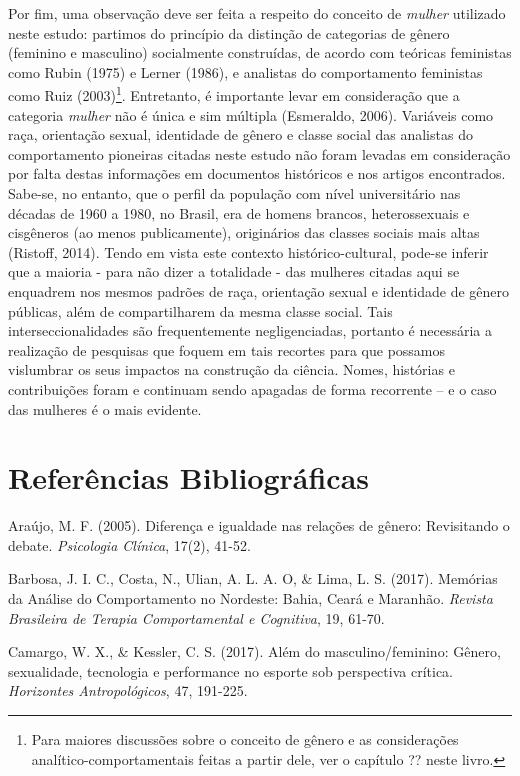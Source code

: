 Por fim, uma observação deve ser feita a respeito do conceito de \textit{mulher} utilizado neste estudo: partimos do princípio da distinção de categorias de gênero (feminino e masculino) socialmente construídas, de acordo com teóricas feministas como Rubin (1975) e Lerner (1986), e analistas do comportamento feministas como Ruiz (2003)\footnote{Para maiores discussões sobre o conceito de gênero e as considerações analítico-comportamentais feitas a partir dele, ver o capítulo ?? neste livro.}. Entretanto, é importante levar em consideração que a categoria \textit{mulher} não é única e sim múltipla (Esmeraldo, 2006). Variáveis como raça, orientação sexual, identidade de gênero e classe social das analistas do comportamento pioneiras citadas neste estudo não foram levadas em consideração por falta destas informações em documentos históricos e nos artigos encontrados. Sabe-se, no entanto, que o perfil da população com nível universitário nas décadas de 1960 a 1980, no Brasil, era de homens brancos, heterossexuais e cisgêneros (ao menos publicamente), originários das classes sociais mais altas (Ristoff, 2014). Tendo em vista este contexto histórico-cultural, pode-se inferir que a maioria - para não dizer a totalidade - das mulheres citadas aqui se enquadrem nos mesmos padrões de raça, orientação sexual e identidade de gênero públicas, além de compartilharem da mesma classe social. Tais interseccionalidades são frequentemente negligenciadas, portanto é necessária a realização de pesquisas que foquem em tais recortes para que possamos vislumbrar os seus impactos na construção da ciência. Nomes, histórias e contribuições foram e continuam sendo apagadas de forma recorrente – e o caso das mulheres é o mais evidente.

\chapter*{Referências Bibliográficas}
\hangindent=25pt
\noindent Araújo, M. F. (2005). Diferença e igualdade nas relações de gênero: Revisitando o debate. \textit{Psicologia Clínica}, 17(2), 41-52.

\hangindent=25pt
\noindent Barbosa, J. I. C., Costa, N., Ulian, A. L. A. O, \& Lima, L. S. (2017). Memórias da Análise do Comportamento no Nordeste: Bahia, Ceará e Maranhão. \textit{Revista Brasileira de Terapia Comportamental e Cognitiva}, 19, 61-70.

\hangindent=25pt
\noindent Camargo, W. X., \& Kessler, C. S. (2017). Além do masculino/feminino: Gênero, sexualidade, tecnologia e performance no esporte sob perspectiva crítica. \textit{Horizontes Antropológicos}, 47, 191-225.

